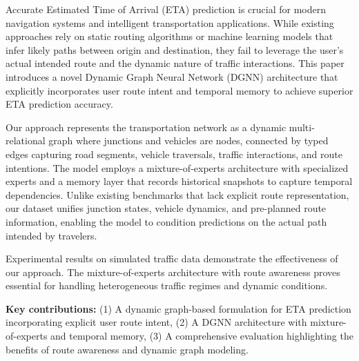 Accurate Estimated Time of Arrival (ETA) prediction is crucial for modern navigation systems and intelligent transportation applications. 
While existing approaches rely on static routing algorithms or machine learning models that infer likely paths between origin and destination, they fail to leverage the user's actual intended route and the dynamic nature of traffic interactions. 
This paper introduces a novel Dynamic Graph Neural Network (DGNN) architecture that explicitly incorporates user route intent and temporal memory to achieve superior ETA prediction accuracy.

Our approach represents the transportation network as a dynamic multi-relational graph where junctions and vehicles are nodes, connected by typed edges capturing road segments, vehicle traversals, traffic interactions, and route intentions. The model employs a mixture-of-experts architecture with specialized experts and a memory layer that records historical snapshots to capture temporal dependencies. Unlike existing benchmarks that lack explicit route representation, our dataset unifies junction states, vehicle dynamics, and pre-planned route information, enabling the model to condition predictions on the actual path intended by travelers.

Experimental results on simulated traffic data demonstrate the effectiveness of our approach. The mixture-of-experts architecture with route awareness proves essential for handling heterogeneous traffic regimes and dynamic conditions.

\textbf{Key contributions:} (1) A dynamic graph-based formulation for ETA prediction incorporating explicit user route intent, (2) A DGNN architecture with mixture-of-experts and temporal memory, (3) A comprehensive evaluation highlighting the benefits of route awareness and dynamic graph modeling. 
